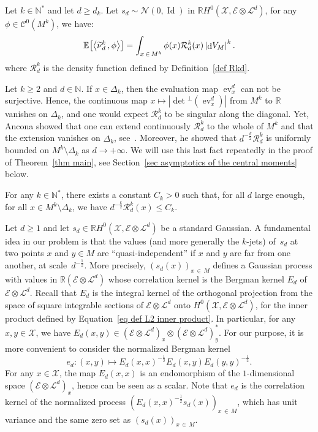 \documentclass[10pt]{amsart}
\theoremstyle{definition}\newtheorem{defi}[theo]{Definition}\newtheorem{rema}[theo]{Remark}\newtheorem{exam}[theo]{Example}\newtheorem{exem}[theo]{Example}\newtheorem{nota}[theo]{Notation}
\DeclareMathOperator{\dmesure}{d}
\DeclareMathOperator{\ev}{ev}
\DeclareMathOperator{\Id}{Id}
\newcommand{\E}{\mathcal{E}}
\newcommand{\X}{\mathcal{X}}
\renewcommand{\L}{\mathcal{L}}
\newcommand{\clN}{\mathcal{N}}
\newcommand{\clC}{\mathcal{C}}
\newcommand{\clR}{\mathcal{R}}
\newcommand{\N}{\mathbb{N}}
\newcommand{\R}{\mathbb{R}}
\newcommand{\esp}[2][]{\mathbb{E}_{#1}\!\left[#2 \right]}
\newcommand{\prsc}[2]{\left\langle #1\,, #2 \right\rangle}
\renewcommand{\H}{H^0(\X,\E \otimes \L^d)}
\renewcommand{\geq}{\geqslant}
\renewcommand{\leq}{\leqslant}
\renewcommand{\tilde}{\widetilde}
\let\oldtilde\tilde
\renewcommand*{\tilde}[1]{\mathchoice{\widetilde{#1}}{\widetilde{#1}}{\oldtilde{#1}}{\oldtilde{#1}}}
\begin{document}
\begin{prop}\label{prop Kac Rice}
Let $k \in \N^*$ and let $d \geq d_k$. Let $s_d \sim \clN(0,\Id)$ in $\R\H$, for any $\phi \in \clC^0(M^k)$, we have:
\[
\esp{\prsc{\tilde{\nu}_d^k}{\phi}} = \int_{x\,\in\,M^k} \phi(x) \clR^k_d(x) \left|\dmesure\! V_{M}\right|^k.
\]
where $\clR^k_d$ is the density function defined by Definition~\ref{def Rkd}.
\end{prop}

Let $k \geq 2$ and $d \in \N$. If $x \in \Delta_k$, then the evaluation map $\ev_x^d$ can not be surjective. Hence, the continuous map $x \mapsto |\det\!^\perp\!(\ev^d_x)|$ from $M^k$ to $\R$ vanishes on $\Delta_k$, and one would expect $\clR^k_d$ to be singular along the diagonal. Yet, Ancona showed that one can extend continuously $\clR^k_d$ to the whole of $M^k$ and that the extension vanishes on $\Delta_k$, see~\cite[Theorem~4.7]{Anc2019}. Moreover, he showed that $d^{-\frac{k}{2}}\clR^k_d$ is uniformly bounded on $M^k \setminus \Delta_k$ as $d \to +\infty$. We will use this last fact repeatedly in the proof of Theorem~\ref{thm main}, see Section~\ref{sec asymptotics of the central moments} below.

\begin{prop}\label{prop bounded density}
For any $k\in \N^*$, there exists a constant $C_k >0$ such that, for all $d$ large enough, for all $x \in M^k \setminus \Delta_k$, we have $d^{-\frac{k}{2}}\clR^k_d(x)\leq C_k$.
\end{prop}

Let $d \geq 1$ and let $s_d \in \R\H$ be a standard Gaussian. A fundamental idea in our problem is that the values (and more generally the $k$-jets) of~$s_d$ at two points $x$ and $y \in M$ are ``quasi-independent'' if $x$ and $y$ are far from one another, at scale~$d^{-\frac{1}{2}}$. More precisely, $(s_d(x))_{x\,\in\,M}$ defines a Gaussian process with values in $\R(\E \otimes \L^d)$ whose correlation kernel is the Bergman kernel $E_d$ of $\E \otimes \L^d$. Recall that $E_d$ is the integral kernel of the orthogonal projection from the space of square integrable sections of $\E \otimes \L^d$ onto $\H$, for the inner product defined by Equation~\eqref{eq def L2 inner product}. In particular, for any $x,y \in \X$, we have $E_d(x,y) \in (\E \otimes \L^d)_x \otimes (\E \otimes \L^d)^*_y$. For our purpose, it is more convenient to consider the normalized Bergman kernel
\[
e_d:(x,y) \mapsto E_d(x,x)^{-\frac{1}{2}}E_d(x,y)E_d(y,y)^{-\frac{1}{2}}.
\]
For any $x \in \X$, the map $E_d(x,x)$ is an endomorphism of the $1$-dimensional space $(\E \otimes \L^d)_x$, hence can be seen as a scalar. Note that $e_d$ is the correlation kernel of the normalized process $(E_d(x,x)^{-\frac{1}{2}}s_d(x))_{x\,\in\,M}$, which has unit variance and the same zero set as $(s_d(x))_{x\,\in\,M}$.
\end{document}
